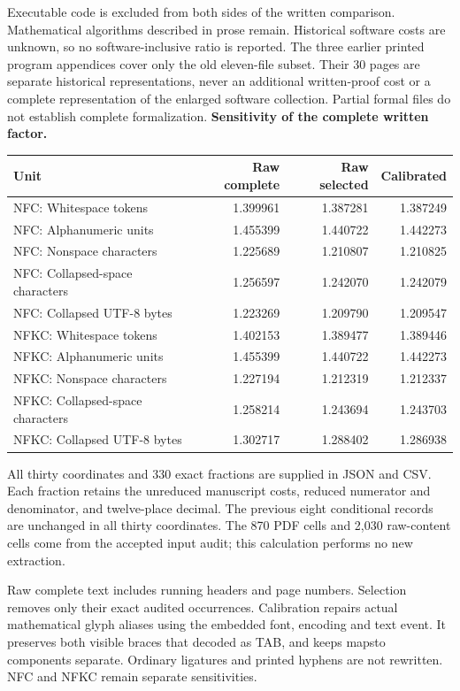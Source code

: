 \documentclass[11pt,a4paper]{article}
\begin{document}
Executable code is excluded from both sides of the written comparison. Mathematical algorithms described in prose remain. Historical software costs are unknown, so no software-inclusive ratio is reported. The three earlier printed program appendices cover only the old eleven-file subset. Their 30 pages are separate historical representations, never an additional written-proof cost or a complete representation of the enlarged software collection. Partial formal files do not establish complete formalization.
\newpage
\textbf{Sensitivity of the complete written factor.}
\begin{center}\small\begin{tabular}{lrrr}\toprule
Unit & Raw complete & Raw selected & Calibrated\\\midrule
NFC: Whitespace tokens & 1.399961 & 1.387281 & 1.387249\\
NFC: Alphanumeric units & 1.455399 & 1.440722 & 1.442273\\
NFC: Nonspace characters & 1.225689 & 1.210807 & 1.210825\\
NFC: Collapsed-space characters & 1.256597 & 1.242070 & 1.242079\\
NFC: Collapsed UTF-8 bytes & 1.223269 & 1.209790 & 1.209547\\
NFKC: Whitespace tokens & 1.402153 & 1.389477 & 1.389446\\
NFKC: Alphanumeric units & 1.455399 & 1.440722 & 1.442273\\
NFKC: Nonspace characters & 1.227194 & 1.212319 & 1.212337\\
NFKC: Collapsed-space characters & 1.258214 & 1.243694 & 1.243703\\
NFKC: Collapsed UTF-8 bytes & 1.302717 & 1.288402 & 1.286938\\
\bottomrule\end{tabular}\end{center}
All thirty coordinates and 330 exact fractions are supplied in JSON and CSV. Each fraction retains the unreduced manuscript costs, reduced numerator and denominator, and twelve-place decimal. The previous eight conditional records are unchanged in all thirty coordinates. The 870 PDF cells and 2,030 raw-content cells come from the accepted input audit; this calculation performs no new extraction.

Raw complete text includes running headers and page numbers. Selection removes only their exact audited occurrences. Calibration repairs actual mathematical glyph aliases using the embedded font, encoding and text event. It preserves both visible braces that decoded as TAB, and keeps mapsto components separate. Ordinary ligatures and printed hyphens are not rewritten. NFC and NFKC remain separate sensitivities.
\end{document}
